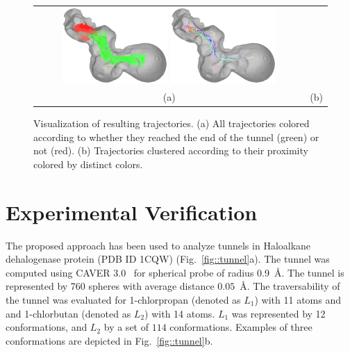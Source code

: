 \documentclass{svmult}
\def\LA{L_1}
\def\LB{L_2}
\begin{document}
\begin{figure}
\centering
\begin{tabular}{cc}
\includegraphics[width=0.4\textwidth]{fig/trajectories-all}
\includegraphics[width=0.4\textwidth]{fig/trajectories-clustered-21} \\
(a) & (b) \\                       
\end{tabular}
\caption{Visualization of resulting trajectories.
(a) All trajectories colored according to whether they reached the end of the tunnel (green) or not (red).
(b) Trajectories clustered according to their proximity colored by distinct colors.
\label{fig:trajectories}
}
\end{figure}




\section{Experimental Verification}

The proposed approach has been used to analyze tunnels in Haloalkane dehalogenase protein (PDB ID 1CQW) (Fig.~\ref{fig::tunnel}a).
The tunnel was computed using CAVER 3.0~\cite{caver3} for spherical probe of radius 0.9~\AA.
The tunnel is represented by 760 spheres with average distance $0.05$~\AA.
The traversability of the tunnel was evaluated for 1-chlorpropan (denoted as $\LA$) with 11 atoms and 
and 1-chlorbutan (denoted as $\LB$) with 14 atoms.
$\LA$ was represented by 12 conformations, and $\LB$ by a set of $114$ conformations.
Examples of three conformations are depicted in Fig.~\ref{fig::tunnel}b.
\end{document}
